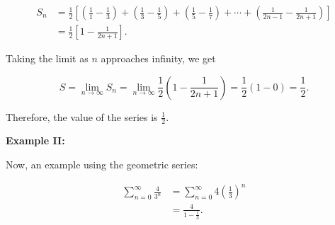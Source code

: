 \begin{align*}
    S_n &= \frac{1}{2} \left[ \left( \frac{1}{1} - \frac{1}{3} \right) + \left( \frac{1}{3} - \frac{1}{5} \right) + \left( \frac{1}{5} - \frac{1}{7} \right) + \cdots + \left( \frac{1}{2n - 1} - \frac{1}{2n + 1} \right) \right] \\
    &= \frac{1}{2} \left[ 1 - \frac{1}{2n + 1} \right].
\end{align*}

Taking the limit as \(n\) approaches infinity, we get

\[
    S = \lim_{n \to \infty} S_n = \lim_{n \to \infty} \frac{1}{2} \left( 1 - \frac{1}{2n + 1} \right) = \frac{1}{2} (1 - 0) = \frac{1}{2}.
\]

Therefore, the value of the series is \(\frac{1}{2}\).

\textbf{Example II:}

Now, an example using the geometric series:

\begin{align*}
    \sum_{n = 0}^{\infty} \frac{4}{3^n} &=  \sum_{n = 0}^{\infty} 4 \left(\frac{1}{3}\right)^n \\
    &= \frac{4}{1 - \frac{1}{3}}.
\end{align*}
